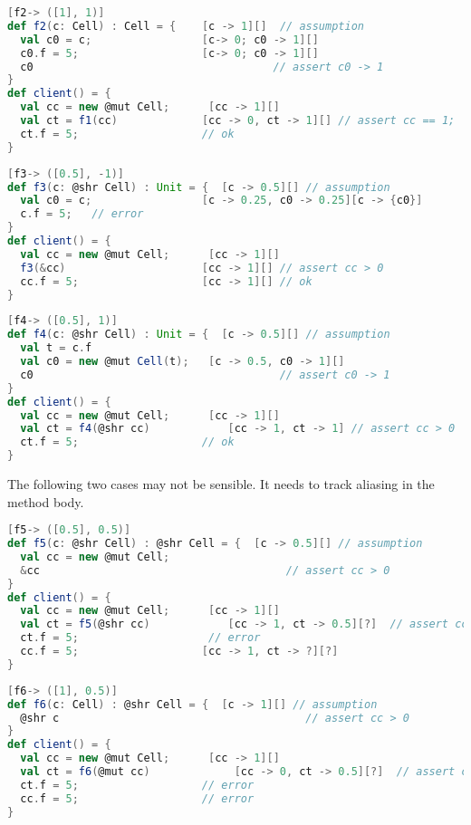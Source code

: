 \begin{lstlisting}[language=Scala,basicstyle=\footnotesize\ttfamily]
[f2-> ([1], 1)] 
def f2(c: Cell) : Cell = {    [c -> 1][]  // assumption
  val c0 = c;                 [c-> 0; c0 -> 1][]
  c0.f = 5;                   [c-> 0; c0 -> 1][]
  c0                                     // assert c0 -> 1
}    
def client() = {
  val cc = new @mut Cell;      [cc -> 1][]
  val ct = f1(cc)             [cc -> 0, ct -> 1][] // assert cc == 1; 
  ct.f = 5;                   // ok   
}
\end{lstlisting}

\begin{lstlisting}[language=Scala,basicstyle=\footnotesize\ttfamily]
[f3-> ([0.5], -1)] 
def f3(c: @shr Cell) : Unit = {  [c -> 0.5][] // assumption
  val c0 = c;                 [c -> 0.25, c0 -> 0.25][c -> {c0}]
  c.f = 5;   // error         
}
def client() = {
  val cc = new @mut Cell;      [cc -> 1][]
  f3(&cc)                     [cc -> 1][] // assert cc > 0
  cc.f = 5;                   [cc -> 1][] // ok
}  
\end{lstlisting}

\begin{lstlisting}[language=Scala,basicstyle=\footnotesize\ttfamily]
[f4-> ([0.5], 1)] 
def f4(c: @shr Cell) : Unit = {  [c -> 0.5][] // assumption
  val t = c.f
  val c0 = new @mut Cell(t);   [c -> 0.5, c0 -> 1][]
  c0                                      // assert c0 -> 1 
}
def client() = {
  val cc = new @mut Cell;      [cc -> 1][]
  val ct = f4(@shr cc)            [cc -> 1, ct -> 1] // assert cc > 0
  ct.f = 5;                   // ok
}  
\end{lstlisting}

The following two cases may not be sensible. It needs to track aliasing in the method body.
\begin{lstlisting}[language=Scala,basicstyle=\footnotesize\ttfamily]
[f5-> ([0.5], 0.5)] 
def f5(c: @shr Cell) : @shr Cell = {  [c -> 0.5][] // assumption
  val cc = new @mut Cell;
  &cc                                      // assert cc > 0
}
def client() = {
  val cc = new @mut Cell;      [cc -> 1][]
  val ct = f5(@shr cc)            [cc -> 1, ct -> 0.5][?]  // assert cc > 0 
  ct.f = 5;                    // error
  cc.f = 5;                   [cc -> 1, ct -> ?][?]
}  
\end{lstlisting}

\begin{lstlisting}[language=Scala,basicstyle=\footnotesize\ttfamily]
[f6-> ([1], 0.5)] 
def f6(c: Cell) : @shr Cell = {  [c -> 1][] // assumption
  @shr c                                      // assert cc > 0
}
def client() = {
  val cc = new @mut Cell;      [cc -> 1][]
  val ct = f6(@mut cc)             [cc -> 0, ct -> 0.5][?]  // assert cc == 1
  ct.f = 5;                   // error
  cc.f = 5;                   // error
}  
\end{lstlisting}

